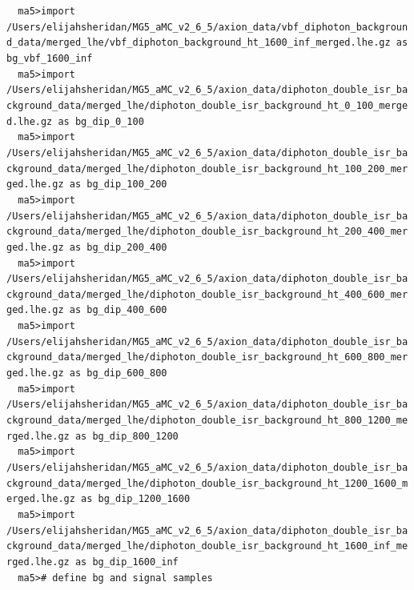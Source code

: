 \documentclass[a4paper, 10pt]{article}
\begin{document}
\texttt{ }\texttt{ }\texttt{ma5>import /\-Users/\-elijahsheridan/\-MG5\_aMC\_v2\_6\_5/\-axion\_data/\-vbf\_diphoton\_background\_data/\-merged\_lhe/\-vbf\_diphoton\_background\_ht\_1600\_inf\_merged.lhe.gz as bg\_vbf\_1600\_inf\\
}
\texttt{ }\texttt{ }\texttt{ma5>import /\-Users/\-elijahsheridan/\-MG5\_aMC\_v2\_6\_5/\-axion\_data/\-diphoton\_double\_isr\_background\_data/\-merged\_lhe/\-diphoton\_double\_isr\_background\_ht\_0\_100\_merged.lhe.gz as bg\_dip\_0\_100\\
}
\texttt{ }\texttt{ }\texttt{ma5>import /\-Users/\-elijahsheridan/\-MG5\_aMC\_v2\_6\_5/\-axion\_data/\-diphoton\_double\_isr\_background\_data/\-merged\_lhe/\-diphoton\_double\_isr\_background\_ht\_100\_200\_merged.lhe.gz as bg\_dip\_100\_200\\
}
\texttt{ }\texttt{ }\texttt{ma5>import /\-Users/\-elijahsheridan/\-MG5\_aMC\_v2\_6\_5/\-axion\_data/\-diphoton\_double\_isr\_background\_data/\-merged\_lhe/\-diphoton\_double\_isr\_background\_ht\_200\_400\_merged.lhe.gz as bg\_dip\_200\_400\\
}
\texttt{ }\texttt{ }\texttt{ma5>import /\-Users/\-elijahsheridan/\-MG5\_aMC\_v2\_6\_5/\-axion\_data/\-diphoton\_double\_isr\_background\_data/\-merged\_lhe/\-diphoton\_double\_isr\_background\_ht\_400\_600\_merged.lhe.gz as bg\_dip\_400\_600\\
}
\texttt{ }\texttt{ }\texttt{ma5>import /\-Users/\-elijahsheridan/\-MG5\_aMC\_v2\_6\_5/\-axion\_data/\-diphoton\_double\_isr\_background\_data/\-merged\_lhe/\-diphoton\_double\_isr\_background\_ht\_600\_800\_merged.lhe.gz as bg\_dip\_600\_800\\
}
\texttt{ }\texttt{ }\texttt{ma5>import /\-Users/\-elijahsheridan/\-MG5\_aMC\_v2\_6\_5/\-axion\_data/\-diphoton\_double\_isr\_background\_data/\-merged\_lhe/\-diphoton\_double\_isr\_background\_ht\_800\_1200\_merged.lhe.gz as bg\_dip\_800\_1200\\
}
\texttt{ }\texttt{ }\texttt{ma5>import /\-Users/\-elijahsheridan/\-MG5\_aMC\_v2\_6\_5/\-axion\_data/\-diphoton\_double\_isr\_background\_data/\-merged\_lhe/\-diphoton\_double\_isr\_background\_ht\_1200\_1600\_merged.lhe.gz as bg\_dip\_1200\_1600\\
}
\texttt{ }\texttt{ }\texttt{ma5>import /\-Users/\-elijahsheridan/\-MG5\_aMC\_v2\_6\_5/\-axion\_data/\-diphoton\_double\_isr\_background\_data/\-merged\_lhe/\-diphoton\_double\_isr\_background\_ht\_1600\_inf\_merged.lhe.gz as bg\_dip\_1600\_inf\\
}
\texttt{ }\texttt{ }\texttt{ma5>\# define bg and signal samples\\
}
\end{document}
